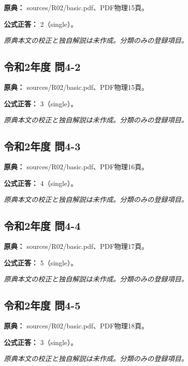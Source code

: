\noindent\textbf{原典：} sources/R02/basic.pdf、PDF物理15頁。

\textbf{公式正答：} 2（single）。

\par\textit{原典本文の校正と独自解説は未作成。分類のみの登録項目。}

\subsection{令和2年度 問4-2}
\label{q:r02-reg-basic-4-2}

\noindent\textbf{原典：} sources/R02/basic.pdf、PDF物理15頁。

\textbf{公式正答：} 3（single）。

\par\textit{原典本文の校正と独自解説は未作成。分類のみの登録項目。}

\subsection{令和2年度 問4-3}
\label{q:r02-reg-basic-4-3}

\noindent\textbf{原典：} sources/R02/basic.pdf、PDF物理16頁。

\textbf{公式正答：} 4（single）。

\par\textit{原典本文の校正と独自解説は未作成。分類のみの登録項目。}

\subsection{令和2年度 問4-4}
\label{q:r02-reg-basic-4-4}

\noindent\textbf{原典：} sources/R02/basic.pdf、PDF物理17頁。

\textbf{公式正答：} 5（single）。

\par\textit{原典本文の校正と独自解説は未作成。分類のみの登録項目。}

\subsection{令和2年度 問4-5}
\label{q:r02-reg-basic-4-5}

\noindent\textbf{原典：} sources/R02/basic.pdf、PDF物理18頁。

\textbf{公式正答：} 3（single）。

\par\textit{原典本文の校正と独自解説は未作成。分類のみの登録項目。}

